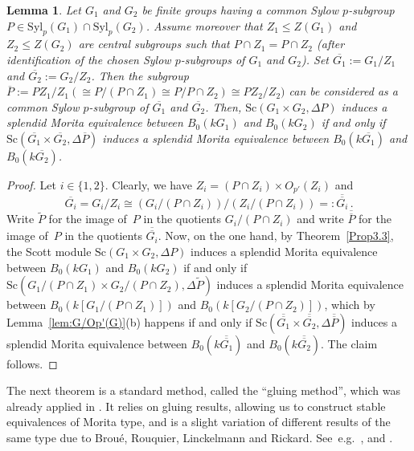 \documentclass[12pt,a4paper]{amsart}
\theoremstyle{plain}\newtheorem{Theorem}{Theorem}[section]
\theoremstyle{plain}\newtheorem{Conjecture}[Theorem]{Conjecture}
\theoremstyle{plain}\newtheorem{Corollary}[Theorem]{Corollary}
\theoremstyle{plain}\newtheorem{Lemma}[Theorem]{Lemma}
\theoremstyle{plain}\newtheorem{Proposition}[Theorem]{Proposition}
\theoremstyle{definition}\newtheorem{Definition}[Theorem]{Definition}
\theoremstyle{definition}\newtheorem{Example}[Theorem]{Example}
\theoremstyle{definition}\newtheorem{Examples}[Theorem]{Examples}
\theoremstyle{definition}\newtheorem{Remark}[Theorem]{Remark}
\theoremstyle{definition}\newtheorem{Question}[Theorem]{Question}
\theoremstyle{definition}\newtheorem{Notation}[Theorem]{Notation}
\theoremstyle{definition}\newtheorem{Hypothesis}[Theorem]{Hypothesis}
\theoremstyle{definition}\newtheorem{Assumption}[Theorem]{Assumption}
\theoremstyle{definition}\newtheorem{Strategy}[Theorem]{Strategy}
\theoremstyle{definition}\newtheorem{Contents}[Theorem]{Contents}
\theoremstyle{definition}\newtheorem{Computations}[Theorem]{Computations}
\theoremstyle{definition}\newtheorem{Equivalences}[Theorem]{Equivalences}
\theoremstyle{definition}\newtheorem{Notation/Definition}[Theorem]{Notation/Definition}
\theoremstyle{definition}\newtheorem{noth}[Theorem]{}
\theoremstyle{plain}\newtheorem{Step}[Theorem]{Step}
\def\Syl{\mathrm{Syl}}
\begin{document}
\begin{Lemma}\label{lem:G/Z(G)}
Let $G_1$ and $G_2$ be finite groups having a common Sylow $p$-subgroup $P\in\Syl_p(G_{1})\cap\Syl_{p}(G_{2})$. 
Assume moreover that $Z_1\leq Z(G_1)$ and $Z_2\leq Z(G_2)$ are central subgroups 
such that $P\cap Z_1=P\cap Z_2$ (after identification of the chosen Sylow $p$-subgroups of $G_{1}$ and $G_{2}$). Set $\overline{G_1}:=G_1/Z_1$ and 
 $\overline{G_2}:=G_2/Z_2$. Then the subgroup  $\overline P:=PZ_1/Z_1 (\cong P/(P\cap Z_{1})\cong P/P\cap Z_{2})\cong  PZ_2/Z_2)$ 
can be considered as a common Sylow $p$-subgroup of $\overline{G_{1}}$ and $\overline{G_{2}}$.
Then, 
${\mathrm{Sc}}(G_1\times G_2,\Delta P)$ induces a splendid Morita equivalence
between $B_0(kG_1)$ and $B_0(kG_2)$ if and only if
${\mathrm{Sc}}(\overline{G_1}\times\overline{G_2},\Delta\overline P)$ induces
a splendid Morita equivalence 
between $B_0(k\overline{G_1})$ and $B_0(k\overline{G_2})$.
\end{Lemma}
%
%
\begin{proof}
Let $i\in\{1,2\}$.
Clearly, we have $Z_i=(P\cap Z_{i})\times O_{p'}(Z_i)$ and 
$$\overline{G_{i}}=G_{i}/Z_{i}\cong \left( G_{i}/(P\cap Z_{i}) \right) 
/\left( Z_{i} / (P\cap Z_{i}) \right)=:\overline{\overline{G_{i}}}\,.$$
Write $\widetilde{P}$  for the image of~$P$ in the quotients $G_{i}/(P\cap Z_{i})$ 
and write $\overline{\overline{P}}$ for the image of~$P$ in the quotients $\overline{\overline{G_{i}}}$. 
Now, on the one hand,  by Theorem~\ref{Prop3.3},  the Scott module 
{${\mathrm{Sc}}(G_1\times G_2,\Delta P)$} induces a splendid Morita equivalence
between $B_0(kG_1)$ and $B_0(kG_2)$
if and only if 
${\mathrm{Sc}}(G_1/(P\cap Z_{1})\times G_2/(P\cap Z_{2}),\Delta \widetilde{P})$ 
induces a splendid Morita equivalence
between $B_0(k[G_1/(P\cap Z_{1})])$ and $B_0(k[G_2/(P\cap Z_{2})])$, 
which by Lemma~\ref{lem:G/Op'(G)}(b)  happens if and only if 
${\mathrm{Sc}}(\overline{\overline{G_{1}}}\times \overline{\overline{G_{2}}},\Delta \overline{\overline{P}})$
induces a splendid Morita equivalence between $B_0(k\overline{\overline{G_1}})$ and $B_0(k\overline{\overline{G_2}})$.
The claim follows. 
\end{proof}


The next theorem is a standard method, called the ``gluing method'', which was already applied in 
\cite{KL20a,KLS20}.  It relies on gluing results, allowing us to 
construct stable equivalences of Morita type, and is a 
slight variation of different results of the same type due to 
Brou\'e, Rouquier, Linckelmann and Rickard.
See~e.g.~{\color{black}\cite[6.3.Theorem]{Bro94}}, \cite[Theorem~5.6]{Rou01} and 
\cite[Theorem 3.1]{Lin01}. 
\end{document}
